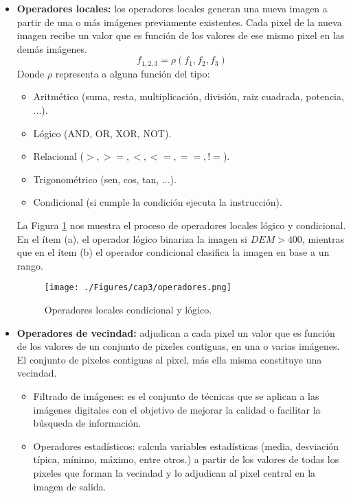 	\begin{itemize}
		\item \textbf{Operadores locales:} los operadores locales generan una nueva imagen a partir de una o m\'as im\'agenes previamente existentes. Cada pixel de la nueva imagen recibe un valor que es funci\'on de los valores de ese mismo pixel en las dem\'as im\'agenes.
		\begin{equation}
		\label{e:opLoc}
		f_{1,2,3}=\rho(f_{1},f_{2},f_{3})
		\end{equation}
		Donde $ \rho $ representa a alguna funci\'on del tipo:
		\begin{itemize}
			\item Aritm\'etico (suma, resta, multiplicaci\'on, divisi\'on, raiz cuadrada, potencia, ...).
			\item L\'ogico (AND, OR, XOR, NOT).
			\item Relacional ($ >, >=, <, <=, ==, != $).
			\item Trigonom\'etrico (sen, cos, tan, ...).
			\item Condicional (si cumple la condición ejecuta la instrucción).
		\end{itemize}
		La Figura \ref{fig:oploccond} nos muestra el proceso de operadores locales l\'ogico y condicional. En el \'item (a), el operador l\'ogico binariza la imagen si $ DEM > 400 $, mientras que en el \'item (b) el operador condicional clasifica la imagen en base a un rango.
		  \begin{figure}[H]
		  	\centering
		  	\texttt{[image: ./Figures/cap3/operadores.png]}
		  	\caption{Operadores locales condicional y l\'ogico.}
		  	\label{fig:oploccond}
		  \end{figure}
		\item  \textbf{Operadores de vecindad:} adjudican a cada pixel un valor que es funci\'on de los valores de un conjunto de pixeles contiguas, en una o varias im\'agenes. El conjunto de pixeles contiguas al pixel, m\'as ella misma constituye una vecindad.
		\begin{itemize}
			\item Filtrado de im\'agenes: es el conjunto de t\'ecnicas que se aplican a las im\'agenes digitales con el objetivo de mejorar la calidad o facilitar la b\'usqueda de informaci\'on.
			\item Operadores estad\'isticos: calcula variables estad\'isticas (media, desviaci\'on t\'ipica, m\'inimo, m\'aximo, entre otros.) a partir de los valores de todas los pixeles que forman la vecindad y lo adjudican al pixel central en la imagen de salida. 

\end{itemize}
\end{itemize}
